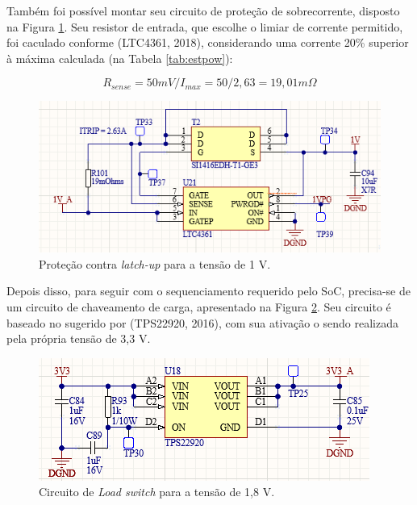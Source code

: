 Também foi possível montar seu circuito de proteção de sobrecorrente, disposto na Figura \ref{fig:1vocp}. Seu resistor de entrada, que escolhe o limiar de corrente permitido, foi caculado conforme (LTC4361, 2018), considerando uma corrente 20\% superior à máxima calculada (na Tabela \ref{tab:estpow}):

\begin{equation}
	R_{sense} = 50 mV / I_{max} =50 / 2,63 = 19,01 m\Omega
\end{equation} 

\begin{figure}[H]
    \centering
    \includegraphics[scale=1]{images/1vocp.png}
    \caption{Proteção contra \textit{latch-up} para a tensão de 1 V.}
    \label{fig:1vocp}
\end{figure}

Depois disso, para seguir com o sequenciamento requerido pelo SoC, precisa-se de um circuito de chaveamento de carga, apresentado na Figura \ref{fig:sw1}. Seu circuito é baseado no sugerido por (TPS22920, 2016), com sua ativação o sendo realizada pela própria tensão de 3,3 V.

\begin{figure}[H]
    \centering
    \includegraphics[scale=1]{images/sw1.png}
    \caption{Circuito de \textit{Load switch} para a tensão de 1,8 V.}
    \label{fig:sw1}
\end{figure}

